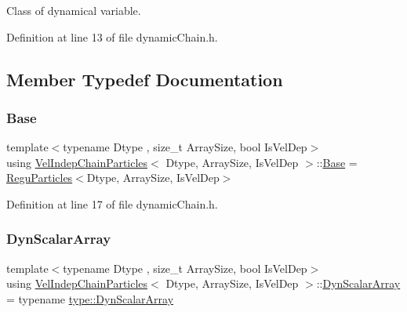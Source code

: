 Class of dynamical variable. 

Definition at line 13 of file dynamic\+Chain.\+h.



\subsection{Member Typedef Documentation}
\mbox{\label{class_vel_indep_chain_particles_a4db664b33c58724109eb23bc24dd893c}} 
\subsubsection{\texorpdfstring{Base}{Base}}
{\footnotesize\ttfamily template$<$typename Dtype , size\+\_\+t Array\+Size, bool Is\+Vel\+Dep$>$ \\
using \mbox{\hyperlink{class_vel_indep_chain_particles}{Vel\+Indep\+Chain\+Particles}}$<$ Dtype, Array\+Size, Is\+Vel\+Dep $>$\+::\mbox{\hyperlink{class_vel_indep_chain_particles_a4db664b33c58724109eb23bc24dd893c}{Base}} =  \mbox{\hyperlink{class_regu_particles}{Regu\+Particles}}$<$Dtype, Array\+Size, Is\+Vel\+Dep$>$}



Definition at line 17 of file dynamic\+Chain.\+h.

\mbox{\label{class_vel_indep_chain_particles_a904d5f59968e5fa9d900b9931cf5aa36}} 
\subsubsection{\texorpdfstring{Dyn\+Scalar\+Array}{DynScalarArray}}
{\footnotesize\ttfamily template$<$typename Dtype , size\+\_\+t Array\+Size, bool Is\+Vel\+Dep$>$ \\
using \mbox{\hyperlink{class_vel_indep_chain_particles}{Vel\+Indep\+Chain\+Particles}}$<$ Dtype, Array\+Size, Is\+Vel\+Dep $>$\+::\mbox{\hyperlink{class_vel_indep_particles_a6bba8ac3f941a144214037a27ccaa119}{Dyn\+Scalar\+Array}} =  typename \mbox{\hyperlink{struct_space_h_1_1_proto_type_a8f3813f576517856e0ed74af9e5ffcb4}{type\+::\+Dyn\+Scalar\+Array}}}



